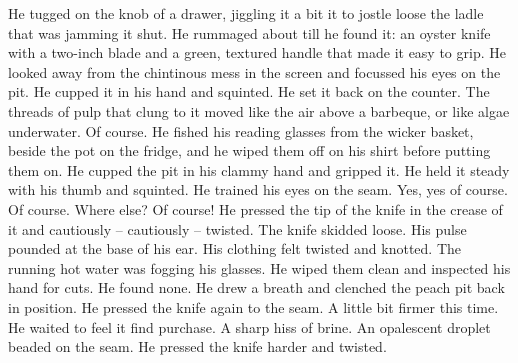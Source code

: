 \documentclass[
]{article}
\begin{document}
He tugged on the knob of a drawer, jiggling it a bit it to jostle loose
the ladle that was jamming it shut. He rummaged about till he found it:
an oyster knife with a two-inch blade and a green, textured handle that
made it easy to grip. He looked away from the chintinous mess in the
screen and focussed his eyes on the pit. He cupped it in his hand and
squinted. He set it back on the counter. The threads of pulp that clung
to it moved like the air above a barbeque, or like algae underwater. Of
course. He fished his reading glasses from the wicker basket, beside the
pot on the fridge, and he wiped them off on his shirt before putting
them on. He cupped the pit in his clammy hand and gripped it. He held it
steady with his thumb and squinted. He trained his eyes on the seam.
Yes, yes of course. Of course. Where else? Of course! He pressed the tip
of the knife in the crease of it and cautiously -- cautiously --
twisted. The knife skidded loose. His pulse pounded at the base of his
ear. His clothing felt twisted and knotted. The running hot water was
fogging his glasses. He wiped them clean and inspected his hand for
cuts. He found none. He drew a breath and clenched the peach pit back in
position. He pressed the knife again to the seam. A little bit firmer
this time. He waited to feel it find purchase. A sharp hiss of brine. An
opalescent droplet beaded on the seam. He pressed the knife harder and
twisted.
\end{document}
